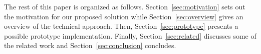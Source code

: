 



The rest of this paper is organized as follows.
Section~\ref{sec:motivation} sets out the motivation for our proposed
solution while Section~\ref{sec:overview} gives an overview of the
technical approach.  Then, Section~\ref{sec:prototype} presents a
possible prototype implementation. Finally, Section~\ref{sec:related}
discusses some of the related work and Section~\ref{sec:conclusion}
concludes.



